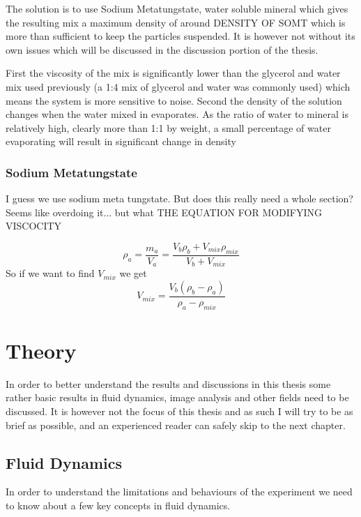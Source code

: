\documentclass[]{report}
\begin{document}
	The solution is to use Sodium Metatungstate, water soluble mineral which gives the resulting mix a maximum density of around DENSITY OF SOMT which is more than sufficient to keep the particles suspended. It is however not without its own issues which will be discussed in the discussion portion of the thesis. 
	
	
	First the viscosity of the mix is significantly lower than the glycerol and water mix used previously (a 1:4 mix of glycerol and water was commonly used) which means the system is more sensitive to noise. 
	Second the density of the solution changes when the water mixed in evaporates. As the ratio of water to mineral is relatively high, clearly more than 1:1 by weight, a small percentage of water evaporating will result in significant change in density
	
	
	
	
\subsection{Sodium Metatungstate}
I guess we use sodium meta tungstate. But does this really need a whole section? Seems like overdoing it... but what %
THE EQUATION FOR MODIFYING VISCOCITY

\begin{equation}
\rho_{a} = 	\frac {m_{a}}{V_{a}} =
				\frac{V_{b}\rho_{b} + V_{mix}\rho_{mix}}{V_b + V_{mix}} 
\end{equation}
So if we want to find $V_{mix}$ we get
\begin{equation}
V_{mix} = \frac{ V_{b}(\rho_{b} - \rho_{a})}{\rho_{a} - \rho_{mix}} 
\end{equation}



\chapter{Theory}
In order to better understand the results and discussions in this thesis some rather basic results in fluid dynamics, image analysis and other fields need to be discussed. It is however not the focus of this thesis and as such I will try to be as brief as possible, and an experienced reader can safely skip to the next chapter.


\section{Fluid Dynamics}
In order to understand the limitations and behaviours of the experiment we need to know about a few key concepts in fluid dynamics.
\end{document}
